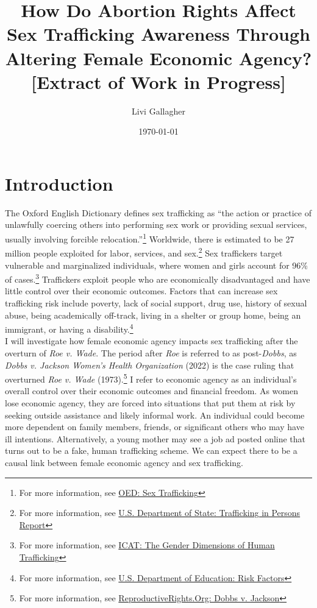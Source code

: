 \documentclass[12pt]{article}
\begin{document}
\title{How Do Abortion Rights Affect Sex Trafficking Awareness Through Altering Female Economic Agency? \\[0.5em] 
\large \textbf{[Extract of Work in Progress]}}
\author{Livi Gallagher}
\date{\today}
\maketitle

\thispagestyle{fancy}
\section{Introduction}
The Oxford English Dictionary defines sex trafficking as ``the action or practice of unlawfully coercing others into performing sex work or providing sexual services, usually involving forcible relocation.''\footnote{For more information, see \href{https://www.oed.com/dictionary/sex-trafficking_n}{OED: Sex Trafficking}} Worldwide, there is estimated to be 27 million people exploited for labor, services, and sex.\footnote{For more information, see \href{https://www.state.gov/reports/2024-trafficking-in-persons-report/}{U.S. Department of State: Trafficking in Persons Report}} Sex traffickers target vulnerable and marginalized individuals, where women and girls account for 96\% of cases.\footnote{For more information, see \href{https://icat.un.org/sites/g/files/tmzbdl461/files/publications/icat-ib-04-v.1.pdf}{ICAT: The Gender Dimensions of Human Trafficking}} Traffickers exploit people who are economically disadvantaged and have little control over their economic outcomes. Factors that can increase sex trafficking risk include poverty, lack of social support, drug use, history of sexual abuse, being academically off-track, living in a shelter or group home, being an immigrant, or having a disability.\footnote{For more information, see \href{https://safesupportivelearning.ed.gov/human-trafficking-americas-schools/risk-factors}{U.S. Department of Education: Risk Factors}}  \\
\indent I will investigate how female economic agency impacts sex trafficking after the overturn of \textit{Roe v. Wade}. The period after \textit{Roe} is referred to as post-\textit{Dobbs}, as \textit{Dobbs v. Jackson Women’s Health Organization} (2022) is the case ruling that overturned \textit{Roe v. Wade} (1973).\footnote{For more information, see \href{https://reproductiverights.org/cases/scotus-mississippi-abortion-ban-dobbs-jackson-womens-health/}{ReproductiveRights.Org: Dobbs v. Jackson}} I refer to economic agency as an individual's overall control over their economic outcomes and financial freedom. As women lose economic agency, they are forced into situations that put them at risk by seeking outside assistance and likely informal work. An individual could become more dependent on family members, friends, or significant others who may have ill intentions. Alternatively, a young mother may see a job ad posted online that turns out to be a fake, human trafficking scheme. We can expect there to be a causal link between female economic agency and sex trafficking. \\
\end{document}
